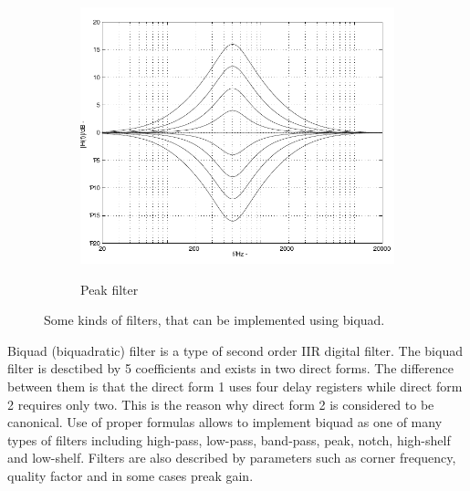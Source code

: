 \documentclass[a4paper,twoside,12pt]{book}
\begin{document}
\begin{figure}[H]
\begin{subfigure}[t]{0.25\textwidth}
        \includegraphics[width=\textwidth]{images/filter_peak}
        \label{fig:peak}
        \caption{Peak filter}
    \end{subfigure}
    \caption{Some kinds of filters, that can be implemented using biquad.}
    \label{fig:biquad}
\end{figure}

Biquad (biquadratic) filter is a type of second order IIR digital filter.
The biquad filter is desctibed by 5 coefficients and exists in two direct forms.
The difference between them is that the direct form 1 uses four delay registers
while direct form 2 requires only two.
This is the reason why direct form 2 is considered to be canonical.
Use of proper formulas allows to implement biquad as one of many types of filters
including high-pass, low-pass, band-pass, peak, notch, high-shelf and low-shelf.
Filters are also described by parameters such as corner frequency, quality factor
and in some cases preak gain.
\cite{Biquad}
\cite{biquad_web}
\end{document}
